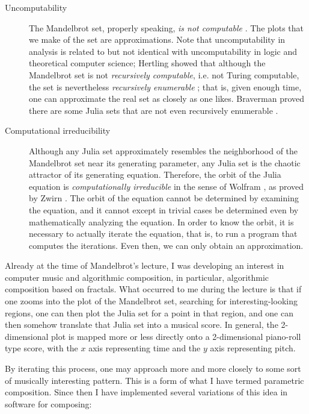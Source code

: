 \documentclass[11pt]{amsart}
\begin{document}
\begin{description}
\item[Uncomputability] The Mandelbrot set, properly speaking, \emph{is not computable} \cite{blum1993godel}. The plots that we make of the set are approximations. Note that uncomputability in analysis is related to but not identical with uncomputability in logic and theoretical computer science; Hertling showed that although the  Mandelbrot set is not \emph{recursively computable}, i.e. not Turing computable, the set is nevertheless \emph{recursively enumerable} \cite{Hertling2005-HERITM-3}; that is, given enough time, one can approximate the real set as closely as one likes. Braverman proved there are some Julia sets that are not even recursively enumerable \cite{braverman2006non, braverman2009computability}.
\item[Computational irreducibility] Although any Julia set approximately resembles the neighborhood of the Mandelbrot set near its generating parameter, any Julia set is the chaotic attractor of its generating equation. Therefore, the orbit of the Julia equation is \emph{computationally irreducible} in the sense of Wolfram \cite{wolfram1985undecidability}, as proved by Zwirn \cite{zwirn2015computational}. The orbit of the equation cannot be determined by examining the equation, and it cannot except in trivial cases be determined even by mathematically analyzing the equation. In order to know the orbit, it is necessary to actually iterate the equation, that is, to run a program that computes the iterations. Even then, we can only obtain an approximation.
\end{description}

Already at the time of Mandelbrot's lecture, I was developing an interest in computer music and algorithmic composition, in particular, algorithmic composition based on fractals. What occurred to me during the lecture is that if one zooms into the plot of the Mandelbrot set, searching for interesting-looking regions, one can then plot the Julia set for a point in that region, and one can then somehow translate that Julia set into a musical score. In general, the 2-dimensional plot is mapped more or less directly onto a 2-dimensional piano-roll type score, with the $x$ axis representing time and the $y$ axis representing pitch.

By iterating this process, one may approach more and more closely to some sort of musically interesting pattern. This is a form of what I have termed parametric composition. Since then I have implemented several variations of this idea in software for composing:
\end{document}

